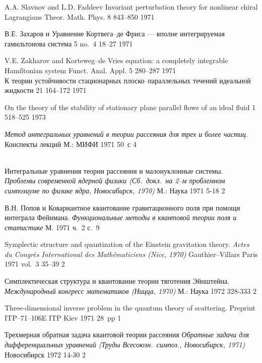 {A.A. Slavnov and L.D. Faddeev}
{Invariant perturbation theory for nonlinear chiral Lagrangians}
{Theor. Math. Phys.} {8} {843--850} {1971}

{В.Е. Захаров и \LD}
{Уравнение Кортвега--де Фриса --- вполне интегрируемая гамильтонова система}
{\FA} {5} {no.~4} {18--27} {1971}

{V.E. Zakharov and \LF}
{Korteweg--de Vries equation: a completely integrable
  Hamiltonian system}
{Funct. Anal. Appl.} {5} {280--287} {1971} \\

{\LD}
{К теории устойчивости стационарных плоско--параллельных
течений идеальной жидкости}
{\Zap} {21} {} {164--172} {1971}

{\LF}
{On the theory of the stability of stationary plane parallel flows of
  an ideal fluid}
{\JSM} {1} {518--525} {1973}

{\LD} 
{\em Метод интегральных уравнений в теории рассеяния для трех и более частиц.} 
{Конспекты лекций} {М.: МИФИ} {} {1971} {} {50~с} {4}

{\LD} \\
{Интегральные уравнения теории рассеяния и малонуклонные системы.} \\
{\em Проблемы современной ядерной физики (Сб.\ докл.\ на 2--м
 проблемном симпозиуме по физике ядра, Новосибирск, 1970)} {М.: Наука} {} {1971}{} {5-18} {2}

{В.Н. Попов и \LD}
{Ковариантное квантование гравитационного поля при помощи интеграла Фейнмана.}
{\em Функциональные методы в квантовой теории поля и статистике}
{} {М.} {1971} {ч.~2} {с.~9}

{\LF} 
{Symplectic structure and quantization of the Einstein gravitation theory.}
{\em Actes du Congr\`es International des Math\'ematiciens (Nice, 1970)}
{Gauthier--Villars} {Paris} {1971} {vol.~3} {35--39} {2}

{\LD}
{Симплектическая структура и квантование теории тяготения Эйнштейна}. \\
{\em Международный конгресс математиков (Ницца, 1970)}
{М.: Наука} {} {1972} {328-333} {2}

{\LF}
{Three-dimensional inverse problem in the quantum theory of scattering.}
{Preprint ITP--71--106E} {ITP} {Kiev} {1971} {} {28~pp} {1}

{Трехмерная обратная задача квантовой теории рассеяния} 
{\em Обратные задачи для дифференциальных уравнений (Труды Всесоюзн.\ симпоз., Новосибирск, 1971)}
{} {Новосибирск} {1972} {} {14-30} {2}

